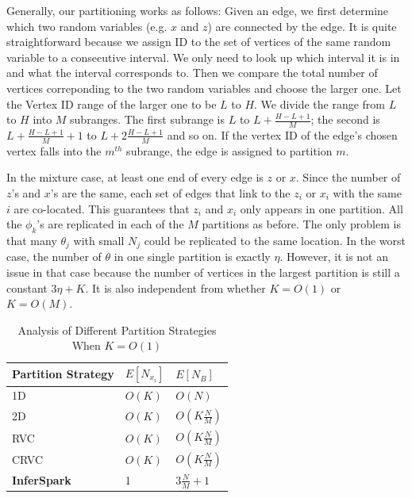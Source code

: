 Generally, our partitioning works as follows: Given an edge, we first determine
which two random variables (e.g. $x$ and $z$) are connected by the edge. It is
quite straightforward because we assign ID to the set of vertices of the same
random variable to a consecutive interval. We only need to look up which
interval it is in and what the interval corresponds to. Then we compare the
total number of vertices correponding to the two random variables and choose
the larger one. Let the Vertex ID range of the larger one to be $L$ to $H$. We
divide the range from $L$ to $H$ into $M$ subranges. The first subrange is $L$
to $L + \frac{H-L+1}{M}$; the second is $L + \frac{H-L+1}{M} + 1$ to $L +
2\frac{H-L+1}{M}$ and so on. If the vertex ID of the edge's chosen vertex falls
into the $m^{th}$ subrange, the edge is assigned to partition $m$.

In the mixture case, at least one end of every edge is $z$ or $x$. Since
the number of $z$'s and $x$'s are the same, 
each set of edges that link to the $z_i$ or $x_i$ with 
the same $i$ are co-located. This guarantees that $z_i$
and $x_i$ only appears in one partition. All the $\phi_k$'s are replicated in each
of the $M$ partitions as before. The only problem is that many $\theta_j$ with
small $N_j$ could be replicated to the same location. In the worst case, the
number of $\theta$ in one single partition is exactly $\eta$. However, it is
not an issue in that case because the number of vertices in the largest
partition is still a constant $3\eta + K$. It is also independent from whether $K
= O(1)$ or $K = O(M)$.


\begin{table}[h]
	\centering
	\caption{Analysis of Different Partition Strategies When $K = O(1)$}
	\label{tab:max_v_per_edge_part_O1}
	\begin{tabular}{lll}
		\hline
		Partition Strategy & $E[N_{x_i}]$ & $E[N_B]$\\\hline\hline
		1D & $O(K)$ & $O(N)$ \\\hline
		2D & $O(K)$ & $O(K\frac{N}{M})$ \\\hline
		RVC & $O(K)$ & $O(K\frac{N}{M})$ \\\hline
		CRVC & $O(K)$ & $O(K\frac{N}{M})$ \\\hline
		{\bf InferSpark} & 1 & $3\frac{N}{M}+1$ \\\hline
	\end{tabular}
\end{table}

